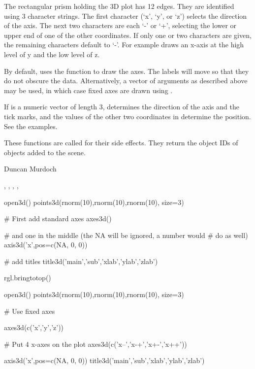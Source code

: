 \begin{Details}\relax
The rectangular prism holding the 3D plot has 12 edges.  They are identified
using 3 character strings.  The first character (`x', `y', or `z') selects 
the direction of the axis.  The next two characters are each `-' or `+',
selecting the lower or upper end of one of the other coordinates.  If only
one or two characters are given, the remaining characters default to `-'.  
For example  draws an x-axis at the high level of y and the
low level of z.

By default,  uses the  function to draw the axes.  
The labels will move so that they do not obscure the data.  Alternatively,
a vector of arguments as described above may be used, in which case
fixed axes are drawn using .

If  is a numeric vector of length 3,  determines
the direction of the axis and the tick marks, and the values of the
other two coordinates in  determine the position.  See the
examples.
\end{Details}
\begin{Value}
These functions are called for their side effects.  They return the object IDs of
objects added to the scene.
\end{Value}
\begin{Author}\relax
Duncan Murdoch
\end{Author}
\begin{SeeAlso}\relax
{}, ,
, , 
\end{SeeAlso}
\begin{Examples}
\begin{ExampleCode}
  open3d()
  points3d(rnorm(10),rnorm(10),rnorm(10), size=3)

  # First add standard axes
  axes3d()  

  # and one in the middle (the NA will be ignored, a number would 
  # do as well)
  axis3d('x',pos=c(NA, 0, 0))

  # add titles
  title3d('main','sub','xlab','ylab','zlab')

  rgl.bringtotop()
  
  open3d()
  points3d(rnorm(10),rnorm(10),rnorm(10), size=3)
  
  # Use fixed axes
  
  axes3d(c('x','y','z'))
         
  # Put 4 x-axes on the plot
  axes3d(c('x--','x-+','x+-','x++'))         
  
  axis3d('x',pos=c(NA, 0, 0))     
  title3d('main','sub','xlab','ylab','zlab')
\end{ExampleCode}
\end{Examples}

